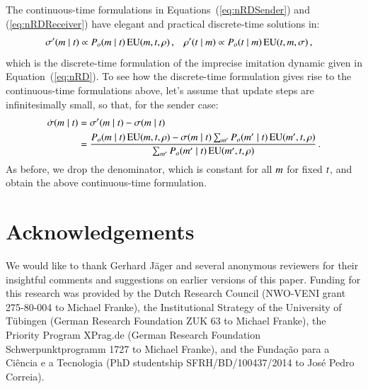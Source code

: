 \documentclass[12pt,english]{article}
\numberwithin{equation}{section}
\begin{document}
\begin{appendices}
The continuous-time formulations in Equations~(\ref{eq:nRDSender}) and (\ref{eq:nRDReceiver})
have elegant and practical discrete-time solutions in:
\begin{align*}
  \sigma'(m \mid t) & \propto P_o(m \mid t) \thinspace \mathrm{EU}(m,
  t, \rho)\,, & \rho'(t \mid m) & \propto P_o(t \mid m)
  \thinspace \mathrm{EU}(t, m, \sigma)\,,
\end{align*}
which is the discrete-time formulation of the imprecise imitation dynamic given in
Equation~(\ref{eq:nRD}). To see how the discrete-time formulation gives rise to the
continuous-time formulations above, let's assume that update steps are infinitesimally small,
so that, for the sender case:
\begin{align*}
  \dot{\sigma}(m \mid t) & = \sigma'(m \mid t) - \sigma(m
  \mid t)\\
  &= \frac{P_o(m \mid t) \thinspace \mathrm{EU}(m, t, \rho) - \sigma(m
    \mid t) \sum_{m'} P_o(m' \mid t) \thinspace \mathrm{EU}(m', t,
    \rho) }{ \sum_{m'} P_o(m' \mid t) \thinspace \mathrm{EU}(m', t,
    \rho)}\,.
\end{align*}
As before, we drop the denominator, which is constant for all $m$ for fixed $t$, and
obtain the above continuous-time formulation.

\end{appendices}

\section*{Acknowledgements}

We would like to thank Gerhard J\"{a}ger and several anonymous reviewers for their insightful comments and suggestions on
earlier versions of this paper. Funding for this research was provided by the Dutch Research
Council (NWO-VENI grant 275-80-004 to Michael Franke), the Institutional Strategy of the
University of T\"{u}bingen (German Research Foundation ZUK 63 to Michael Franke), the Priority
Program XPrag.de (German Research Foundation Schwerpunktprogramm 1727 to Michael Franke), and the Fundação para a Ciência	e a Tecnologia (PhD studentship SFRH/BD/100437/2014 to José Pedro Correia).
\end{document}
